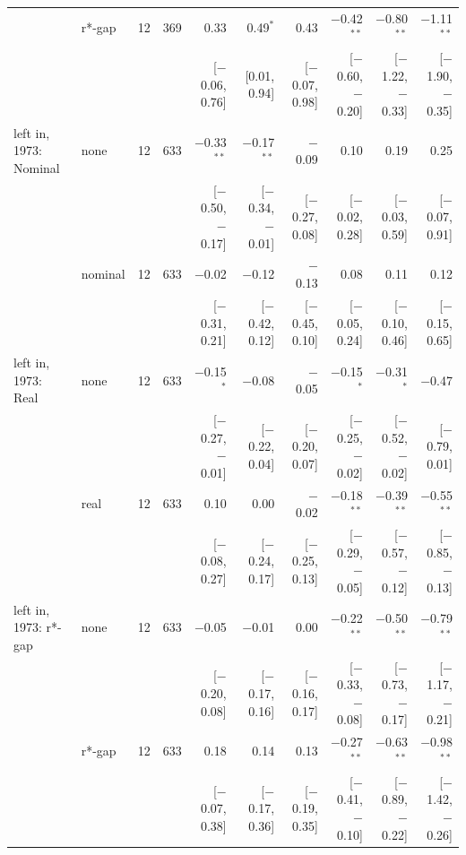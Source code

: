\begin{table}[tp]
{\begin{tabular}{llcrrrrrrr}
 & r*-gap & 12 & 369 & 0.33 & 0.49$^{*}$ & 0.43 & $-$0.42$^{**}$ & $-$0.80$^{**}$ & $-$1.11$^{**}$\\
 & & & & {\scriptsize [$-$0.06, 0.76]} & {\scriptsize [0.01, 0.94]} & {\scriptsize [$-$0.07, 0.98]} & {\scriptsize [$-$0.60, $-$0.20]} & {\scriptsize [$-$1.22, $-$0.33]} & {\scriptsize [$-$1.90, $-$0.35]}\\
\addlinespace
2020 left in, 1973: Nominal & none & 12 & 633 & $-$0.33$^{**}$ & $-$0.17$^{**}$ & $-$0.09 & 0.10 & 0.19 & 0.25\\
 & & & & {\scriptsize [$-$0.50, $-$0.17]} & {\scriptsize [$-$0.34, $-$0.01]} & {\scriptsize [$-$0.27, 0.08]} & {\scriptsize [$-$0.02, 0.28]} & {\scriptsize [$-$0.03, 0.59]} & {\scriptsize [$-$0.07, 0.91]}\\
 & nominal & 12 & 633 & $-$0.02 & $-$0.12 & $-$0.13 & 0.08 & 0.11 & 0.12\\
 & & & & {\scriptsize [$-$0.31, 0.21]} & {\scriptsize [$-$0.42, 0.12]} & {\scriptsize [$-$0.45, 0.10]} & {\scriptsize [$-$0.05, 0.24]} & {\scriptsize [$-$0.10, 0.46]} & {\scriptsize [$-$0.15, 0.65]}\\
\addlinespace
2020 left in, 1973: Real & none & 12 & 633 & $-$0.15$^{*}$ & $-$0.08 & $-$0.05 & $-$0.15$^{*}$ & $-$0.31$^{*}$ & $-$0.47\\
 & & & & {\scriptsize [$-$0.27, $-$0.01]} & {\scriptsize [$-$0.22, 0.04]} & {\scriptsize [$-$0.20, 0.07]} & {\scriptsize [$-$0.25, $-$0.02]} & {\scriptsize [$-$0.52, $-$0.02]} & {\scriptsize [$-$0.79, 0.01]}\\
 & real & 12 & 633 & 0.10 & 0.00 & $-$0.02 & $-$0.18$^{**}$ & $-$0.39$^{**}$ & $-$0.55$^{**}$\\
 & & & & {\scriptsize [$-$0.08, 0.27]} & {\scriptsize [$-$0.24, 0.17]} & {\scriptsize [$-$0.25, 0.13]} & {\scriptsize [$-$0.29, $-$0.05]} & {\scriptsize [$-$0.57, $-$0.12]} & {\scriptsize [$-$0.85, $-$0.13]}\\
\addlinespace
2020 left in, 1973: r*-gap & none & 12 & 633 & $-$0.05 & $-$0.01 & 0.00 & $-$0.22$^{**}$ & $-$0.50$^{**}$ & $-$0.79$^{**}$\\
 & & & & {\scriptsize [$-$0.20, 0.08]} & {\scriptsize [$-$0.17, 0.16]} & {\scriptsize [$-$0.16, 0.17]} & {\scriptsize [$-$0.33, $-$0.08]} & {\scriptsize [$-$0.73, $-$0.17]} & {\scriptsize [$-$1.17, $-$0.21]}\\
 & r*-gap & 12 & 633 & 0.18 & 0.14 & 0.13 & $-$0.27$^{**}$ & $-$0.63$^{**}$ & $-$0.98$^{**}$\\
 & & & & {\scriptsize [$-$0.07, 0.38]} & {\scriptsize [$-$0.17, 0.36]} & {\scriptsize [$-$0.19, 0.35]} & {\scriptsize [$-$0.41, $-$0.10]} & {\scriptsize [$-$0.89, $-$0.22]} & {\scriptsize [$-$1.42, $-$0.26]}\\

\end{tabular}}
\end{table}
